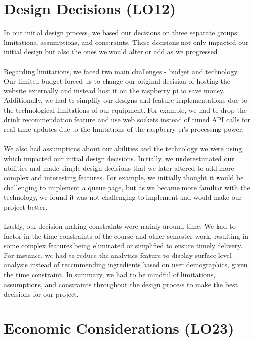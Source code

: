 \documentclass{article}
\begin{document}
\section{Design Decisions (LO12)}

In our initial design process, we based our decisions on three separate groups: limitations, assumptions, and constraints. These decisions not only impacted our initial design but also the ones we would alter or add as we progressed.
\\\\
Regarding limitations, we faced two main challenges - budget and technology. Our limited budget forced us to change our original decision of hosting the website externally and instead host it on the raspberry pi to save money. Additionally, we had to simplify our designs and feature implementations due to the technological limitations of our equipment. For example, we had to drop the drink recommendation feature and use web sockets instead of timed API calls for real-time updates due to the limitations of the raspberry pi's processing power.
\\\\
We also had assumptions about our abilities and the technology we were using, which impacted our initial design decisions. Initially, we underestimated our abilities and made simple design decisions that we later altered to add more complex and interesting features. For example, we initially thought it would be challenging to implement a queue page, but as we became more familiar with the technology, we found it was not challenging to implement and would make our project better.
\\\\
Lastly, our decision-making constraints were mainly around time. We had to factor in the time constraints of the course and other semester work, resulting in some complex features being eliminated or simplified to ensure timely delivery. For instance, we had to reduce the analytics feature to display surface-level analysis instead of recommending ingredients based on user demographics, given the time constraint. In summary, we had to be mindful of limitations, assumptions, and constraints throughout the design process to make the best decisions for our project.

\section{Economic Considerations (LO23)}
\end{document}
